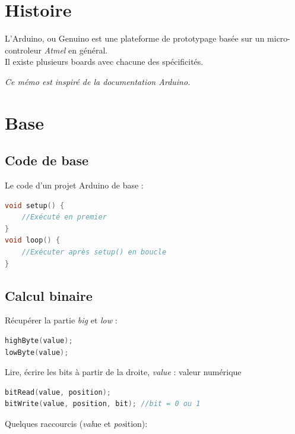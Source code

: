 


    \section{Histoire}
        L'Arduino, ou Genuino est une plateforme de prototypage basée sur un micro-controleur \textit{Atmel} en général.\\
        Il existe plusieurs boards avec chacune des spécificités.

        \emph{Ce mémo est inspiré de la documentation Arduino.}
    \section{Base}
        \subsection{Code de base}
        Le code d'un projet Arduino de base :

        \begin{lstlisting}[language=C]
void setup() {
    //Exécuté en premier
}
void loop() {
    //Exécuter après setup() en boucle
}
        \end{lstlisting}


        \subsection{Calcul binaire}
            Récupérer la partie \textit{big} et \textit{low} :

            \begin{lstlisting}[language=C]
highByte(value);
lowByte(value);
            \end{lstlisting}
            Lire, écrire les bits à partir de la droite, \textit{value} : valeur numérique
            \begin{lstlisting}[language=C]
bitRead(value, position);
bitWrite(value, position, bit); //bit = 0 ou 1
            \end{lstlisting}
            Quelques raccourcis (\textit{val}ue et \textit{pos}ition):


